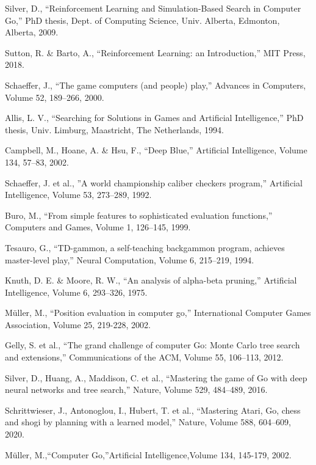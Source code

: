 \documentclass[conference]{IEEEtran}
\begin{document}
\begin{thebibliography}{}

 Silver, D., ``Reinforcement Learning and Simulation-Based Search in Computer Go,'' PhD thesis, Dept. of Computing Science, Univ. Alberta, Edmonton, Alberta, 2009.

 Sutton, R. \& Barto, A., ``Reinforcement Learning: an Introduction,'' MIT Press, 2018.

 Schaeffer, J., ``The game computers (and people) play,'' Advances in Computers, Volume 52, 189–266, 2000.

 Allis, L. V., ``Searching for Solutions in Games and Artificial Intelligence,'' PhD thesis,
Univ. Limburg, Maastricht, The Netherlands, 1994.

 Campbell, M., Hoane, A. \& Hsu, F., ``Deep Blue,'' Artificial Intelligence, Volume 134, 57–83, 2002.

 Schaeffer, J. et al., ''A world championship caliber checkers program,'' Artificial Intelligence, Volume 53, 273–289, 1992.

 Buro, M., ``From simple features to sophisticated evaluation functions,'' Computers and Games, Volume 1, 126–145, 1999.

 Tesauro, G., ``TD-gammon, a self-teaching backgammon program, achieves master-level play,'' Neural Computation, Volume 6, 215–219, 1994.

 Knuth, D. E. \& Moore, R. W., ``An analysis of alpha-beta pruning,'' Artificial Intelligence, Volume 6, 293–326, 1975. 

 Müller, M., ``Position evaluation in computer go,'' International Computer Games Association, Volume 25, 219-228, 2002.

 Gelly, S. et al., ``The grand challenge of computer Go: Monte Carlo tree search and extensions,'' Communications of the ACM, Volume 55, 106–113, 2012.

 Silver, D., Huang, A., Maddison, C. et al., ``Mastering the game of Go with deep neural networks and tree search,'' Nature, Volume 529, 484–489, 2016.

 Schrittwieser, J., Antonoglou, I., Hubert, T. et al., ``Mastering Atari, Go, chess and shogi by planning with a learned model,'' Nature, Volume 588, 604–609, 2020.
 
 Müller, M.,``Computer Go,''Artificial Intelligence,Volume 134, 145-179, 2002.


\end{thebibliography}
\end{document}
